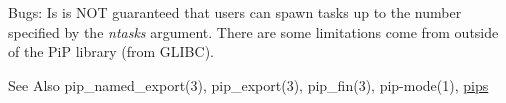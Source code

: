 \begin{DoxyParagraph}{Bugs\-:}
Is is N\-O\-T guaranteed that users can spawn tasks up to the number specified by the {\itshape ntasks} argument. There are some limitations come from outside of the Pi\-P library (from G\-L\-I\-B\-C). \par
\par

\end{DoxyParagraph}
\begin{DoxySeeAlso}{See Also}
pip\-\_\-named\-\_\-export(3), pip\-\_\-export(3), pip\-\_\-fin(3), pip-\/mode(1), \hyperlink{group__pips}{pips} \par
\par

\end{DoxySeeAlso}
